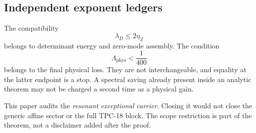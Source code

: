 \subsection{Independent exponent ledgers}

The compatibility
\[
 \lambda_D\le2\eta_Z
\]
belongs to determinant energy and zero-mode assembly.  The
condition
\[
 \Lambda_{\mathrm{phys}}<\frac1{400}
\]
belongs to the final physical loss.  They are not interchangeable,
and equality at the latter endpoint is a stop.  A spectral saving
already present inside an analytic theorem may not be charged a
second time as a physical gain.

\begin{remark}
This paper audits the \emph{resonant exceptional carrier}.  Closing
it would not close the generic affine sector or the full TPC-18
block.  The scope restriction is part of the theorem, not a
disclaimer added after the proof.
\end{remark}
